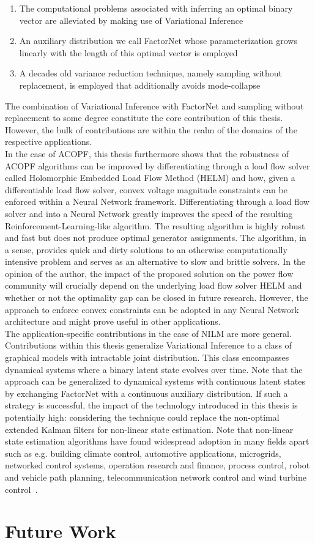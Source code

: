 \documentclass[11pt]{cmuthesis} %
\begin{document}
\begin{enumerate}
\item The computational problems associated with inferring an optimal binary vector are alleviated by making use of Variational Inference
\item An auxiliary distribution we call FactorNet whose parameterization grows linearly with the length of this optimal vector is employed
\item A decades old variance reduction technique, namely sampling without replacement, is employed that additionally avoids mode-collapse
\end{enumerate}

The combination of Variational Inference with FactorNet and sampling without replacement to some degree constitute the core contribution of this thesis. However, the bulk of contributions are within the realm of the domains of the respective applications.\\

In the case of ACOPF, this thesis furthermore shows that the robustness of ACOPF algorithms can be improved by differentiating through a load flow solver called Holomorphic Embedded Load Flow Method (HELM) and how, given a differentiable load flow solver, convex voltage magnitude constraints can be enforced within a Neural Network framework. Differentiating through a load flow solver and into a Neural Network greatly improves the speed of the resulting Reinforcement-Learning-like algorithm. The resulting algorithm is highly robust and fast but does not produce optimal generator assignments. The algorithm, in a sense, provides quick and dirty solutions to an otherwise computationally intensive problem and serves as an alternative to slow and brittle solvers. In the opinion of the author, the impact of the proposed solution on the power flow community will crucially depend on the underlying load flow solver HELM and whether or not the optimality gap can be closed in future research. However, the approach to enforce convex constraints can be adopted in any Neural Network architecture and might prove useful in other applications.\\

The application-specific contributions in the case of NILM are more general. Contributions within this thesis generalize Variational Inference to a class of graphical models with intractable joint distribution. This class encompasses dynamical systems where a binary latent state evolves over time. Note that the approach can be generalized to dynamical systems with continuous latent states by exchanging FactorNet with a continuous auxiliary distribution. If such a strategy is successful, the impact of the technology introduced in this thesis is potentially high: considering the technique could replace the non-optimal extended Kalman filters for non-linear state estimation. Note that non-linear state estimation algorithms have found widespread adoption in many fields apart such as e.g. building climate control, automotive applications, microgrids, networked control systems, operation research and finance, process control, robot and vehicle path planning, telecommunication network control and wind turbine control~\cite{mesbah2016stochastic}.

\chapter{Future Work}
\label{chapter:future_work}




\end{document}
